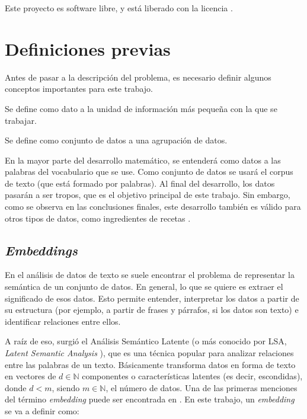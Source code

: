 Este proyecto es software libre, y está liberado con la licencia \cite{gplv3}.

\section*{Definiciones previas}

Antes de pasar a la descripción del problema, es necesario definir algunos conceptos importantes para
este trabajo.

\begin{definition}[Dato]
    Se define como dato a la unidad de información más pequeña con la que se trabajar.
\end{definition}

\begin{definition}
    Se define como conjunto de datos a una agrupación de datos.
\end{definition}

En la mayor parte del desarrollo matemático, se entenderá como datos a las palabras del vocabulario que se use. Como conjunto de datos
se usará el corpus de texto (que está formado por palabras). Al final del desarrollo, los datos pasarán a ser tropos, que es el objetivo principal
de este trabajo. Sin embargo, como se observa en las conclusiones finales, este desarrollo también es válido para otros tipos de datos, como ingredientes
de recetas \cite{kazama2018neural}.

\subsection*{\textit{Embeddings}}

En el análisis de datos de texto se suele encontrar el problema de representar la semántica de un conjunto de datos.
En general, lo que se quiere es extraer el significado de esos datos. Esto permite entender, interpretar los datos
a partir de su estructura (por ejemplo, a partir de frases y párrafos, si los datos son texto) e identificar relaciones
entre ellos.

A raíz de eso, surgió el Análisis Semántico Latente (o más conocido por LSA, \textit{Latent Semantic Analysis} \cite{dumais2004latent}),
que es una técnica popular para analizar relaciones entre las palabras de un texto. Básicamente transforma datos en forma de texto en vectores de $d\in\mathbb{N}$
componentes o características latentes (es decir, escondidas), donde $d<m$, siendo $m\in\mathbb{N}$, el número de
datos. Una de las primeras menciones del término \textit{embedding} puede ser encontrada en \cite{landauer1997learning}.
En este trabajo, un \textit{embedding} se va a definir como:

